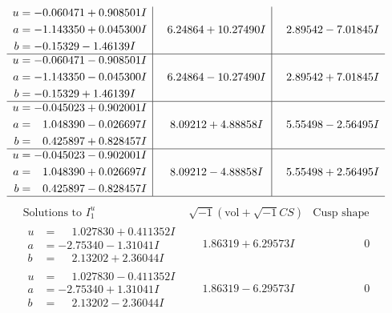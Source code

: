 \documentclass[1p]{elsarticle_modified}
\theoremstyle{definition}
\newcommand{\I}{\sqrt{-1}}
\begin{document}
$$\begin{array}{c|c|c}
\begin{aligned}
u &= -0.060471 + 0.908501 I \\
a &= -1.143350 + 0.045300 I \\
b &= -0.15329 - 1.46139 I\end{aligned}
 & \phantom{-}6.24864 + 10.27490 I & \phantom{-}2.89542 - 7.01845 I \\ \hline\begin{aligned}
u &= -0.060471 - 0.908501 I \\
a &= -1.143350 - 0.045300 I \\
b &= -0.15329 + 1.46139 I\end{aligned}
 & \phantom{-}6.24864 - 10.27490 I & \phantom{-}2.89542 + 7.01845 I \\ \hline\begin{aligned}
u &= -0.045023 + 0.902001 I \\
a &= \phantom{-}1.048390 - 0.026697 I \\
b &= \phantom{-}0.425897 + 0.828457 I\end{aligned}
 & \phantom{-}8.09212 + 4.88858 I & \phantom{-}5.55498 - 2.56495 I \\ \hline\begin{aligned}
u &= -0.045023 - 0.902001 I \\
a &= \phantom{-}1.048390 + 0.026697 I \\
b &= \phantom{-}0.425897 - 0.828457 I\end{aligned}
 & \phantom{-}8.09212 - 4.88858 I & \phantom{-}5.55498 + 2.56495 I\\
 \hline 
 \end{array}$$\newpage$$\begin{array}{c|c|c}  
\text{Solutions to }I^u_{1}& \I (\text{vol} + \sqrt{-1}CS) & \text{Cusp shape}\\
 \hline 
\begin{aligned}
u &= \phantom{-}1.027830 + 0.411352 I \\
a &= -2.75340 - 1.31041 I \\
b &= \phantom{-}2.13202 + 2.36044 I\end{aligned}
 & \phantom{-}1.86319 + 6.29573 I & \phantom{-0.000000 } 0 \\ \hline\begin{aligned}
u &= \phantom{-}1.027830 - 0.411352 I \\
a &= -2.75340 + 1.31041 I \\
b &= \phantom{-}2.13202 - 2.36044 I\end{aligned}
 & \phantom{-}1.86319 - 6.29573 I & \phantom{-0.000000 } 0 \\ \hline\begin{aligned}

\end{aligned}
\end{array}$$
\end{document}
